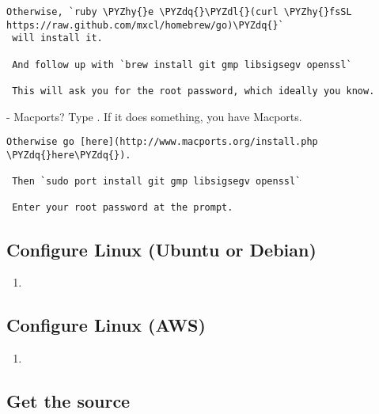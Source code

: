 \begin{framed_shaded}
\begin{Verbatim}[fontsize=\relsize{-2.5},fontseries=b,commandchars=\\\{\}]
 Otherwise, `ruby \PYZhy{}e \PYZdq{}\PYZdl{}(curl \PYZhy{}fsSL https://raw.github.com/mxcl/homebrew/go)\PYZdq{}`
 will install it.

 And follow up with `brew install git gmp libsigsegv openssl`

 This will ask you for the root password, which ideally you know.
\end{Verbatim}
\end{framed_shaded}
   - Macports? Type .  If it does something, you have Macports.

\begin{framed_shaded}
\begin{Verbatim}[fontsize=\relsize{-2.5},fontseries=b,commandchars=\\\{\}]
 Otherwise go [here](http://www.macports.org/install.php \PYZdq{}here\PYZdq{}).

 Then `sudo port install git gmp libsigsegv openssl`

 Enter your root password at the prompt.
\end{Verbatim}
\end{framed_shaded}

\subsection{Configure Linux (Ubuntu or Debian)}

\begin{enumerate}
\item {}
\end{enumerate}

\subsection{Configure Linux (AWS)}

\begin{enumerate}
\item {}
\end{enumerate}

\subsection{Get the source}

